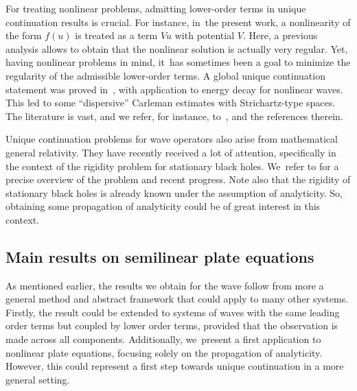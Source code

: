 \documentclass[JEP,XML,SOM,Unicode,published]{cedram}
\theoremstyle{definition}
\begin{document}
For treating nonlinear problems, admitting lower-order terms in unique continuation results is crucial. For instance, in~the present work, a nonlinearity of the form $f(u)$ is treated as a term $V u$ with potential $V$. Here, a previous analysis allows to obtain that the nonlinear solution is actually very regular. Yet, having nonlinear problems in mind, it~has sometimes been a goal to minimize the regularity of the admissible lower-order terms. A global unique continuation statement was proved in~\cite{Ruiz:92}, with application to energy decay for nonlinear waves. This led to some ``dispersive'' Carleman estimates with Strichartz-type spaces. The literature is vast, and we refer, for instance, to~\cite{KRS:87,DDSF:05, KT:05}, and the references therein.

Unique continuation problems for wave operators also arise from mathematical general relativity. They have recently received a lot of attention, specifically in the context of the rigidity problem for stationary black holes. We~refer to \cite{IK:15} for a precise overview of the problem and recent progress. Note also that the rigidity of stationary black holes is already known under the assumption of analyticity. So, obtaining some propagation of analyticity could be of great interest in this context.

\subsection{Main results on semilinear plate equations}\label{s:plateintro}

As mentioned earlier, the results we obtain for the wave follow from more a general method and abstract framework that could apply to many other systems. Firstly, the result could be extended to systems of waves with the same leading order terms but coupled by lower order terms, provided that the observation is made across all components. Additionally, we~present a first application to nonlinear plate equations, focusing solely on the propagation of analyticity. However, this could represent a first step towards unique continuation in a more general setting.
\end{document}
